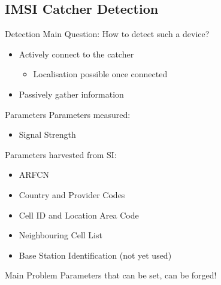 \documentclass{beamer}
\begin{document}
\subsection{IMSI Catcher Detection}
\begin{frame}{Detection}
Main Question: How to detect such a device?
\begin{itemize}
	\item<1-> Actively connect to the catcher
	\begin{itemize}
		\item<1-> Localisation possible once connected
	\end{itemize}
	\item<1-> Passively gather information
\end{itemize}
\vspace{.8cm}
\end{frame}

\begin{frame}{Parameters}
Parameters measured:
\begin{itemize}
	\item Signal Strength
\end{itemize}
\vspace{.3cm}
Parameters harvested from SI:
\begin{itemize}
	\item ARFCN
	\item Country and Provider Codes
	\item Cell ID and Location Area Code
	\item Neighbouring Cell List
	\item Base Station Identification (not yet used)
\end{itemize}
\begin{alertblock}{Main Problem}
Parameters that can be set, can be forged!
\end{alertblock}
\end{frame}
\end{document}
